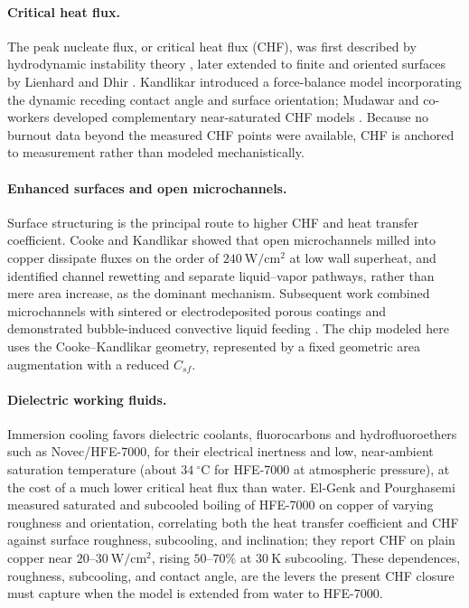 \documentclass[11pt]{article}
\begin{document}
\paragraph{Critical heat flux.}
The peak nucleate flux, or critical heat flux (CHF), was first described by hydrodynamic
instability theory \cite{zuber1959,kutateladze1948}, later extended to finite and oriented
surfaces by Lienhard and Dhir \cite{lienhard1973}. Kandlikar \cite{kandlikar2001}
introduced a force-balance model incorporating the dynamic receding contact angle and
surface orientation; Mudawar and co-workers developed complementary near-saturated CHF
models \cite{mudawar1997}. Because no burnout data beyond the measured CHF points were
available, CHF is anchored to measurement rather than modeled mechanistically.

\paragraph{Enhanced surfaces and open microchannels.}
Surface structuring is the principal route to higher CHF and heat transfer coefficient.
Cooke and Kandlikar \cite{cooke2011,cooke2012} showed that open microchannels milled into
copper dissipate fluxes on the order of $240~\mathrm{W/cm^2}$ at low wall superheat, and
identified channel rewetting and separate liquid--vapor pathways, rather than mere area
increase, as the dominant mechanism. Subsequent work combined microchannels with sintered
or electrodeposited porous coatings \cite{jaikumar2015,patil2014} and demonstrated
bubble-induced convective liquid feeding \cite{jaikumar2016}. The chip modeled here uses
the Cooke--Kandlikar geometry, represented by a fixed geometric area augmentation with a
reduced $C_{sf}$.

\paragraph{Dielectric working fluids.}
Immersion cooling favors dielectric coolants, fluorocarbons and hydrofluoroethers such as
Novec/HFE-7000, for their electrical inertness and low, near-ambient saturation temperature
(about $34~^\circ$C for HFE-7000 at atmospheric pressure), at the cost of a much lower critical heat
flux than water. El-Genk and Pourghasemi \cite{elgenk2021a,elgenk2021b} measured saturated and
subcooled boiling of HFE-7000 on copper of varying roughness and orientation, correlating both the
heat transfer coefficient and CHF against surface roughness, subcooling, and inclination; they
report CHF on plain copper near $20$--$30~\mathrm{W/cm^2}$, rising $50$--$70\%$ at $30~\mathrm{K}$
subcooling. These dependences, roughness, subcooling, and contact angle, are the levers the
present CHF closure must capture when the model is extended from water to HFE-7000.
\end{document}
